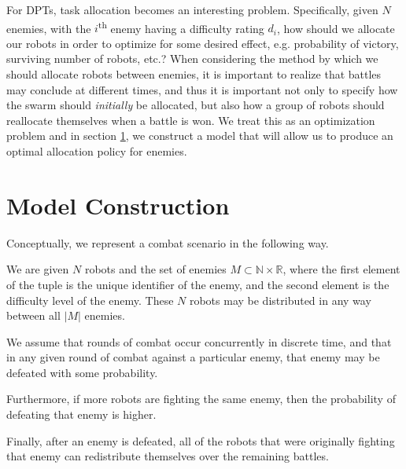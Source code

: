 \documentclass[11pt]{article}
\theoremstyle{definition}
\newcommand{\abs}[1]{\left\vert{#1}\right\vert}
\renewcommand{\th}{\textsuperscript{th}}
\begin{document}
For DPTs, task allocation becomes an interesting problem.
%
Specifically, given $N$ enemies, with the $i$\th{} enemy having a difficulty
rating $d_i$, how should we allocate our robots in order to optimize for some
desired effect, e.g. probability of victory, surviving number of robots, etc.?
%
When considering the method by which we should allocate robots between enemies,
it is important to realize that battles may conclude at different times, and
thus it is important not only to specify how the swarm should \emph{initially}
be allocated, but also how a group of robots should reallocate themselves when
a battle is won.
%
We treat this as an optimization problem and in section \ref{sec:model}, we
construct a model that will allow us to produce an optimal allocation policy
for enemies.

\section{Model Construction}
\label{sec:model}

Conceptually, we represent a combat scenario in the following way.

We are given $N$ robots and the set of enemies
$M \subset \mathbb{N} \times \mathbb{R}$,
where the first element of the tuple is the unique identifier
of the enemy, and the second element is the difficulty level
of the enemy. These $N$ robots may be distributed
in any way between all $\abs{M}$ enemies.

We assume that rounds of combat occur concurrently in discrete time,
and that in any given round of combat against a
particular enemy, that enemy may be defeated
with some probability.

Furthermore, if more robots are fighting
the same enemy, then the probability of
defeating that enemy is higher.

Finally, after an enemy is defeated, all of
the robots that were originally fighting
that enemy can redistribute themselves
over the remaining battles.
\end{document}
